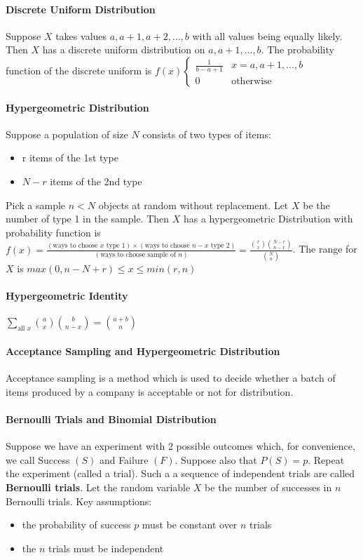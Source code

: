 \documentclass[10pt,letter]{article}
\begin{document}
\paragraph{Discrete Uniform Distribution}
Suppose $X$ takes values $a, a+1, a+2, \ldots, b$ with all values being equally likely. Then $X$ has a discrete uniform distribution on $a,a+1,\ldots, b$. The probability function of the discrete uniform is $f(x)\begin{cases} \frac{1}{b-a+1} & x = a,a+1,\ldots,b \\ 0 & \text{otherwise} \end{cases}$

\paragraph{Hypergeometric Distribution}
Suppose a population of size $N$ consists of two types of items: \begin{itemize}
    \item r items of the 1st type
    \item $N-r$ items of the 2nd type
\end{itemize}
Pick a sample $n<N$ objects at random without replacement. Let $X$ be the number of type 1 in the sample. Then $X$ has a hypergeometric Distribution with probability function is $f(x)=\frac{(\text{ways to choose }x\text{ type 1})\times(\text{ways to choose }n-x\text{ type 2})}{(\text{ways to choose sample of }n)}=\frac{{r \choose x}{N-r \choose n-x}}{{N\choose n}}$. The range for $X$ is $max(0,n-N+r)\leq x\leq min(r,n)$

\paragraph{Hypergeometric Identity}
$\sum_{\text{all } x}{a\choose x}{b\choose n-x}={a+b\choose n}$

\paragraph{Acceptance Sampling and Hypergeometric Distribution}
Acceptance sampling is a method which is used to decide whether a batch of items produced by a company is acceptable or not for distribution. 

\paragraph{Bernoulli Trials and Binomial Distribution}
Suppose we have an experiment with 2 possible outcomes which, for convenience, we call Success $(S)$ and Failure $(F)$. Suppose also that $P(S)=p$. Repeat the experiment (called a trial). Such a a sequence of independent trials are called \textbf{Bernoulli trials}. Let the random variable $X$ be the number of successes in $n$ Bernoulli trials. Key assumptions: \begin{itemize}
    \item the probability of success $p$ must be constant over $n$ trials
    \item the $n$ trials must be independent
\end{itemize}
\end{document}
